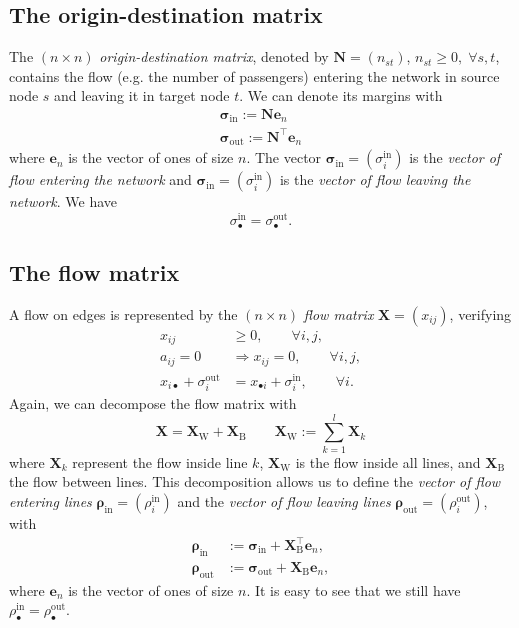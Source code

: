 \documentclass[11p]{article}
\begin{document}
\subsection{The origin-destination matrix}

The $(n \times n)$ \emph{origin-destination matrix}, denoted by $\mathbf{N} = (n_{st})$, $n_{st} \geq 0, \; \forall s,t$, contains the flow (e.g. the number of passengers) entering the network in source node $s$ and leaving it in target node $t$. We can denote its margins with 
\begin{align}
\bm{\sigma}_\text{in} := \mathbf{N} \mathbf{e}_n \\
\bm{\sigma}_\text{out} := \mathbf{N}^\top \mathbf{e}_n
\end{align}
where $\mathbf{e}_n$ is the vector of ones of size $n$. The vector $\bm{\sigma}_\text{in} = (\sigma^\text{in}_i)$ is the \emph{vector of flow entering the network} and $\bm{\sigma}_\text{in} = (\sigma^\text{in}_i)$ is the \emph{vector of flow leaving the network}. We have
\begin{equation}
\sigma^\text{in}_{\bullet} = \sigma^\text{out}_{\bullet}.
\end{equation}

\subsection{The flow matrix}

A flow on edges is represented by the $(n \times n)$ \emph{flow matrix} $\mathbf{X} = (x_{ij})$, verifying
\begin{align}
x_{ij} &\geq 0, \qquad \forall i,j, \\
a_{ij} = 0 &\Rightarrow x_{ij} = 0, \qquad \forall i,j, \\ 
x_{i\bullet} + \sigma^\text{out}_i &= x_{\bullet i} + \sigma^\text{in}_i, \qquad \forall i.
\end{align}
Again, we can decompose the flow matrix with 
\begin{equation}
\mathbf{X} = \mathbf{X}_\text{W} + \mathbf{X}_\text{B} \qquad \mathbf{X}_\text{W} := \sum_{k=1}^l \mathbf{X}_k
\end{equation}
where $\mathbf{X}_k$ represent the flow inside line $k$, $\mathbf{X}_\text{W}$ is the flow inside all lines, and $\mathbf{X}_\text{B}$ the flow between lines. This decomposition allows us to define 
the \emph{vector of flow entering lines} $\bm{\rho}_\text{in} = (\rho^\text{in}_i)$ and the \emph{vector of flow leaving lines} $\bm{\rho}_\text{out} = (\rho^\text{out}_i)$, with
\begin{align}
\bm{\rho}_\text{in} &:= \bm{\sigma}_\text{in} + \mathbf{X}^\top_\text{B} \mathbf{e}_n, \\
\bm{\rho}_\text{out} &:= \bm{\sigma}_\text{out} + \mathbf{X}_\text{B} \mathbf{e}_n,
\end{align}
where $\mathbf{e}_n$ is the vector of ones of size $n$. It is easy to see that we still have $\rho^\text{in}_\bullet = \rho^\text{out}_\bullet$. \\
\end{document}
